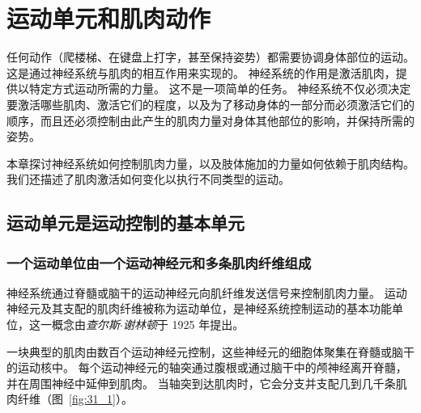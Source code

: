 \chapter{运动单元和肌肉动作} \label{chap:chap31}

任何动作（爬楼梯、在键盘上打字，甚至保持姿势）都需要协调身体部位的运动。
这是通过神经系统与肌肉的相互作用来实现的。
神经系统的作用是激活肌肉，提供以特定方式运动所需的力量。
这不是一项简单的任务。
神经系统不仅必须决定要激活哪些肌肉、激活它们的程度，以及为了移动身体的一部分而必须激活它们的顺序，而且还必须控制由此产生的肌肉力量对身体其他部位的影响，并保持所需的姿势。


本章探讨神经系统如何控制肌肉力量，以及肢体施加的力量如何依赖于肌肉结构。
我们还描述了肌肉激活如何变化以执行不同类型的运动。



\section{运动单元是运动控制的基本单元}

\subsection{一个运动单位由一个运动神经元和多条肌肉纤维组成}

神经系统通过脊髓或脑干的运动神经元向肌纤维发送信号来控制肌肉力量。
运动神经元及其支配的肌肉纤维被称为运动单位，是神经系统控制运动的基本功能单位，这一概念由\textit{查尔斯$\cdot$谢林顿}于 1925 年提出。


一块典型的肌肉由数百个运动神经元控制，这些神经元的细胞体聚集在脊髓或脑干的运动核中。
每个运动神经元的轴突通过腹根或通过脑干中的颅神经离开脊髓，并在周围神经中延伸到肌肉。
当轴突到达肌肉时，它会分支并支配几到几千条肌肉纤维（图~\ref{fig:31_1}）。


